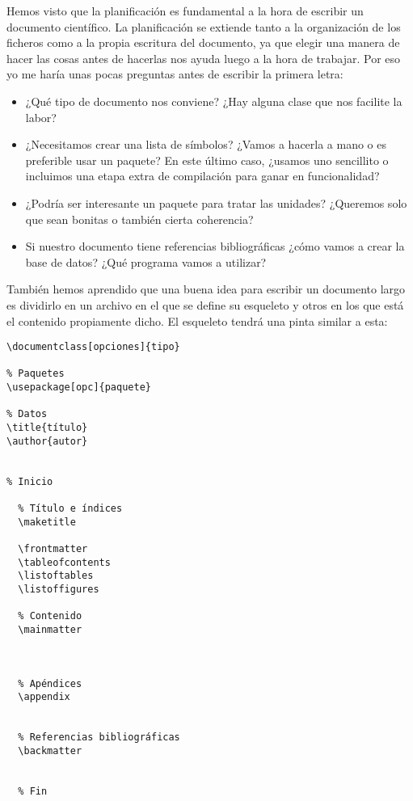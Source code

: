 Hemos visto que la planificación es fundamental a la hora de escribir un
documento científico. La planificación se extiende tanto a la
organización de los ficheros como a la propia escritura del documento,
ya que elegir una manera de hacer las cosas antes de hacerlas nos ayuda
luego a la hora de trabajar. Por eso yo me haría unas pocas preguntas
antes de escribir la primera letra:

\begin{itemize}
\item
  ¿Qué tipo de documento nos conviene? ¿Hay alguna clase que nos
  facilite la labor?
\item
  ¿Necesitamos crear una lista de símbolos? ¿Vamos a hacerla a mano o es
  preferible usar un paquete? En este último caso, ¿usamos uno
  sencillito o incluimos una etapa extra de compilación para ganar en
  funcionalidad?
\item
  ¿Podría ser interesante un paquete para tratar las unidades? ¿Queremos
  solo que sean bonitas o también cierta coherencia?
\item
  Si nuestro documento tiene referencias bibliográficas ¿cómo vamos a
  crear la base de datos? ¿Qué programa vamos a utilizar?
\end{itemize}

También hemos aprendido que una buena idea para escribir un documento
largo es dividirlo en un archivo en el que se define su esqueleto y
otros en los que está el contenido propiamente dicho. El esqueleto
tendrá una pinta similar a esta:

\begin{lstlisting}[language={[latex]tex}]
% Definición del documento
\documentclass[opciones]{tipo}

% Paquetes
\usepackage[opc]{paquete}

% Datos
\title{título}
\author{autor}


% Inicio

  % Título e índices
  \maketitle

  \frontmatter
  \tableofcontents
  \listoftables
  \listoffigures

  % Contenido
  \mainmatter
  
  

  % Apéndices
  \appendix
  

  % Referencias bibliográficas
  \backmatter
  
  
  % Fin

\end{lstlisting}

